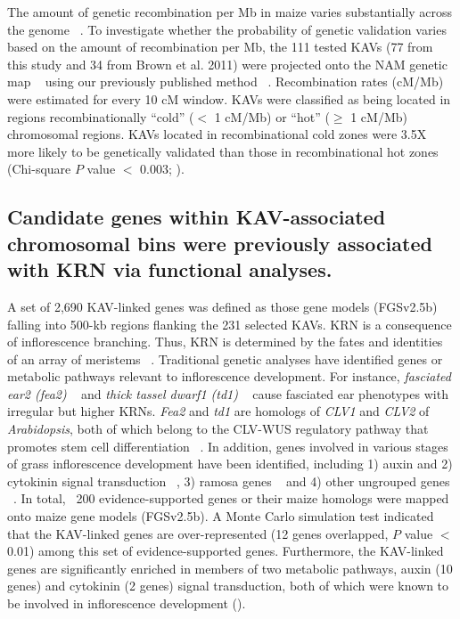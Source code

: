 \documentclass[10pt,letterpaper]{article}
\begin{document}
The amount of genetic recombination per Mb in maize varies substantially across the genome ~\cite{Fu2002}. To investigate whether the probability of genetic validation varies based on the amount of recombination per Mb, the 111 tested KAVs (77 from this study and 34 from Brown et al. 2011) were projected onto the NAM genetic map ~\cite{Buckler2009} using our previously published method ~\cite{Liu2009}. Recombination rates (cM/Mb) were estimated for every 10 cM window. KAVs were classified as being located in regions recombinationally “cold” ($<$ 1 cM/Mb) or “hot” ($\geq$ 1 cM/Mb) chromosomal regions. KAVs located in recombinational cold zones were 3.5X more likely to be genetically validated than those in recombinational hot zones (Chi-square $P$ value $<$ 0.003; ). 

\subsection*{Candidate genes within KAV-associated chromosomal bins were previously associated with KRN via functional analyses.}
A set of 2,690 KAV-linked genes was defined as those gene models (FGSv2.5b) falling into 500-kb regions flanking the 231 selected KAVs. KRN is a consequence of inflorescence branching. Thus, KRN is determined by the fates and identities of an array of meristems ~\cite{Barazesh2008}. Traditional genetic analyses have identified genes or metabolic pathways relevant to inflorescence development. For instance, \emph{fasciated ear2 (fea2)} ~\cite{Bommert2013} and \emph{thick tassel dwarf1 (td1)} ~\cite{Bommert2005} cause fasciated ear phenotypes with irregular but higher KRNs. \emph{Fea2} and \emph{td1} are homologs of \emph{CLV1} and \emph{CLV2} of \emph{Arabidopsis}, both of which belong to the CLV-WUS regulatory pathway that promotes stem cell differentiation ~\cite{Clark2001}. In addition, genes involved in various stages of grass inflorescence development have been identified, including 1) auxin and 2) cytokinin signal transduction ~\cite{Barazesh2008, Sigmon2010}, 3) ramosa genes ~\cite{Bortiri2006} and 4) other ungrouped genes ~\cite{McSteen2001, Upadyayula2006, Xu2011}. In total, ~200 evidence-supported genes or their maize homologs were mapped onto maize gene models (FGSv2.5b). A Monte Carlo simulation test indicated that the KAV-linked genes are over-represented (12 genes overlapped, $P$ value $<$ 0.01) among this set of evidence-supported genes. Furthermore, the KAV-linked genes are significantly enriched in members of two metabolic pathways, auxin (10 genes) and cytokinin (2 genes) signal transduction, both of which were known to be involved in inflorescence development (). 
\end{document}
